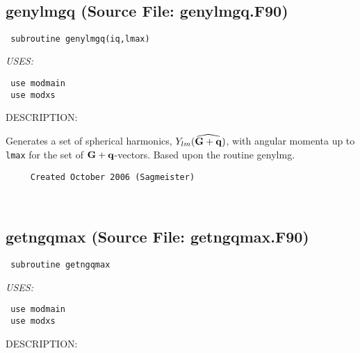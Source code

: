 \documentclass[11pt]{article}
\begin{document}
\mbox{}\hrulefill\ 
 
\subsection{genylmgq (Source File: genylmgq.F90)}


\begin{verbatim} subroutine genylmgq(iq,lmax)\end{verbatim}{\em USES:}
\begin{verbatim} use modmain
 use modxs\end{verbatim}
{\sf DESCRIPTION:\\ }


     Generates a set of spherical harmonics, $Y_{lm}(\widehat{{\bf G}+{\bf q}})$,
     with angular
     momenta up to {\tt lmax} for the set of ${\bf G+q}$-vectors. Based upon
     the routine genylmg.
  
\begin{verbatim}     Created October 2006 (Sagmeister)\end{verbatim}












 
 
\mbox{}\hrulefill\ 
 
\subsection{getngqmax (Source File: getngqmax.F90)}


\begin{verbatim} subroutine getngqmax\end{verbatim}{\em USES:}
\begin{verbatim} use modmain
 use modxs\end{verbatim}
{\sf DESCRIPTION:\\ }
\end{document}
